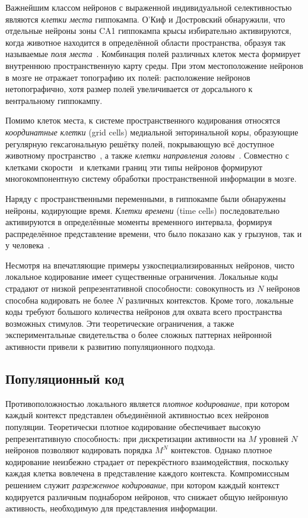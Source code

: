 Важнейшим классом нейронов с выраженной индивидуальной селективностью являются \textit{клетки места} гиппокампа. О'Киф и Достровский обнаружили, что отдельные нейроны зоны CA1 гиппокампа крысы избирательно активируются, когда животное находится в определённой области пространства, образуя так называемые \textit{поля места}~\cite{o1971hippocampus}. Комбинация полей различных клеток места формирует внутреннюю пространственную карту среды. При этом местоположение нейронов в мозге не отражает топографию их полей: расположение нейронов нетопографично, хотя размер полей увеличивается от дорсального к вентральному гиппокампу.

Помимо клеток места, к системе пространственного кодирования относятся \textit{координатные клетки} (grid cells) медиальной энторинальной коры, образующие регулярную гексагональную решётку полей, покрывающую всё доступное животному пространство~\cite{Hafting2005}, а также \textit{клетки направления головы}~\cite{Taube1990}. Совместно с клетками скорости~\cite{kropff2015speed} и клетками границ эти типы нейронов формируют многокомпонентную систему обработки пространственной информации в мозге.

Наряду с пространственными переменными, в гиппокампе были обнаружены нейроны, кодирующие время. \textit{Клетки времени} (time cells) последовательно активируются в определённые моменты временного интервала, формируя распределённое представление времени, что было показано как у грызунов, так и у человека~\cite{Umbach2020, Cao2022}.

Несмотря на впечатляющие примеры узкоспециализированных нейронов, чисто локальное кодирование имеет существенные ограничения. Локальные коды страдают от низкой репрезентативной способности: совокупность из $N$ нейронов способна кодировать не более $N$ различных контекстов. Кроме того, локальные коды требуют большого количества нейронов для охвата всего пространства возможных стимулов. Эти теоретические ограничения, а также экспериментальные свидетельства о более сложных паттернах нейронной активности привели к развитию популяционного подхода.

\subsection{Популяционный код}
\label{sec:population_coding}

Противоположностью локального является \textit{плотное кодирование}, при котором каждый контекст представлен объединённой активностью всех нейронов популяции. Теоретически плотное кодирование обеспечивает высокую репрезентативную способность: при дискретизации активности на $M$ уровней $N$ нейронов позволяют кодировать порядка $M^N$ контекстов. Однако плотное кодирование неизбежно страдает от перекрёстного взаимодействия, поскольку каждая клетка вовлечена в представление каждого контекста. Компромиссным решением служит \textit{разреженное кодирование}, при котором каждый контекст кодируется различным поднабором нейронов, что снижает общую нейронную активность, необходимую для представления информации.

